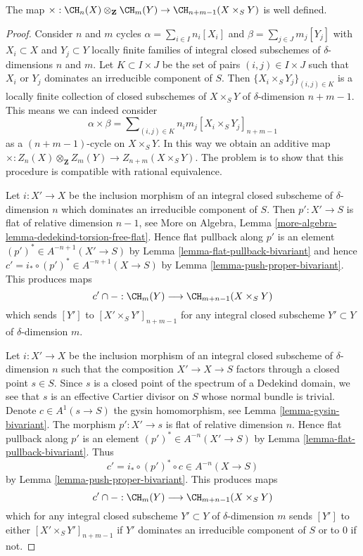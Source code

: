 \begin{lemma}
\label{lemma-exterior-product-well-defined-dim-1}
The map $\times : \CH_n(X) \otimes_{\mathbf{Z}} \CH_m(Y) \to
\CH_{n + m - 1}(X \times_S Y)$ is well defined.
\end{lemma}

\begin{proof}
Consider $n$ and $m$ cycles $\alpha = \sum_{i \in I} n_i[X_i]$
and $\beta = \sum_{j \in J} m_j[Y_j]$ with $X_i \subset X$ and $Y_j \subset Y$
locally finite families of integral closed subschemes of
$\delta$-dimensions $n$ and $m$. Let $K \subset I \times J$ be the set
of pairs $(i, j) \in I \times J$ such that $X_i$ or $Y_j$ dominates
an irreducible component of $S$.
Then $\{X_i \times_S Y_j\}_{(i, j) \in K}$ is a locally finite
collection of closed subschemes of $X \times_S Y$ of
$\delta$-dimension $n + m - 1$. This means we can indeed consider
$$
\alpha \times \beta =
\sum\nolimits_{(i, j) \in K} n_i m_j [X_i \times_S Y_j]_{n + m - 1}
$$
as a $(n + m - 1)$-cycle on $X \times_S Y$. In this way we obtain an
additive map
$\times : Z_n(X) \otimes_{\mathbf{Z}} Z_m(Y) \to Z_{n + m}(X \times_S Y)$.
The problem is to show that
this procedure is compatible with rational equivalence.

\medskip\noindent
Let $i : X' \to X$ be the inclusion morphism of an integral closed subscheme
of $\delta$-dimension $n$ which dominates an irreducible component
of $S$. Then $p' : X' \to S$ is flat of relative dimension $n - 1$, see
More on Algebra, Lemma \ref{more-algebra-lemma-dedekind-torsion-free-flat}.
Hence flat pullback along $p'$ is an element
$(p')^* \in A^{-n + 1}(X' \to S)$ by
Lemma \ref{lemma-flat-pullback-bivariant}
and hence $c' = i_* \circ (p')^* \in A^{-n + 1}(X \to S)$ by
Lemma \ref{lemma-push-proper-bivariant}.
This produces maps
$$
c' \cap - : \CH_m(Y) \longrightarrow \CH_{m + n - 1}(X \times_S Y)
$$
which sends $[Y']$ to $[X' \times_S Y']_{n + m - 1}$ for any
integral closed subscheme $Y' \subset Y$ of $\delta$-dimension $m$.

\medskip\noindent
Let $i : X' \to X$ be the inclusion morphism of an integral closed subscheme
of $\delta$-dimension $n$ such that the composition $X' \to X \to S$ 
factors through a closed point $s \in S$. Since $s$ is a closed point
of the spectrum of a Dedekind domain, we see that $s$ is an effective
Cartier divisor on $S$ whose normal bundle is trivial. Denote
$c \in A^1(s \to S)$ the gysin homomorphism, see
Lemma \ref{lemma-gysin-bivariant}. The morphism $p' : X' \to s$
is flat of relative dimension $n$. Hence flat pullback along $p'$
is an element $(p')^* \in A^{-n}(X' \to S)$ by
Lemma \ref{lemma-flat-pullback-bivariant}.
Thus
$$
c' = i_* \circ (p')^* \circ c \in A^{-n}(X \to S)
$$
by Lemma \ref{lemma-push-proper-bivariant}. This produces maps
$$
c' \cap - : \CH_m(Y) \longrightarrow \CH_{m + n - 1}(X \times_S Y)
$$
which for any integral closed subscheme $Y' \subset Y$
of $\delta$-dimension $m$
sends $[Y']$ to either $[X' \times_S Y']_{n + m - 1}$ if $Y'$ dominates
an irreducible component of $S$ or to $0$ if not.


\end{proof}
